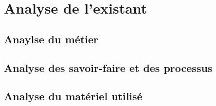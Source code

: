 \section{Analyse de l'existant}



\subsection{Anaylse du métier}

\subsection{Analyse des savoir-faire et des processus}

\subsection{Analyse du matériel utilisé}


